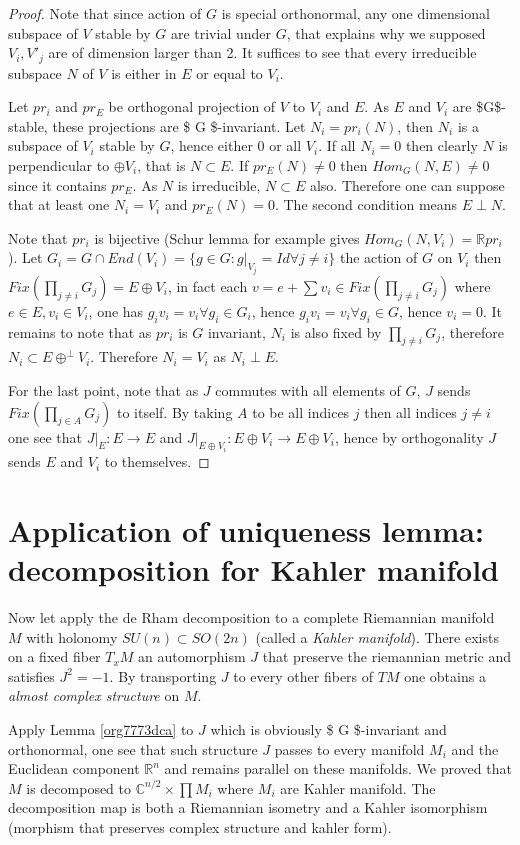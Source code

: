 \documentclass[11pt]{article}
\begin{document}
\begin{proof}
Note that since action of \(G\) is special orthonormal, any one dimensional subspace of \(V\) stable by
\(G\) are trivial under \(G\), that explains why we supposed \(V_i, V'_j\) are of dimension larger
than 2. It suffices to see that every irreducible subspace \(N\) of \(V\) is either in \(E\) or equal to
\(V_i\).

Let \(pr_i\) and \(pr_E\) be orthogonal projection of \(V\) to \(V_i\) and \(E\). As \(E\) and \(V_i\) are \$G\$-stable, these
projections are \$ G \$-invariant. Let \(N_i = pr_i(N)\), then \(N_i\) is a subspace of \(V_i\) stable
by \(G\), hence either \(0\) or all \(V_i\). If all \(N_i=0\) then clearly \(N\) is perpendicular to \(\oplus
V_i\), that is \(N\subset E\). If \(pr_E(N)\ne 0\) then \(Hom_G(N, E) \ne 0\) since it contains \(pr_E\). As
\(N\) is irreducible, \(N\subset E\) also. Therefore one can suppose that at least one \(N_i = V_i\) and
\(pr_E(N) = 0\). The second condition means \(E\perp N\). 

Note that \(pr_i\) is bijective (Schur lemma for example gives \(Hom_G(N,V_i) = \mathbb{R}pr_i\)). 
Let \(G_i = G\cap End(V_i) = \{g\in G: g|_{V_j} = Id \forall j\ne i \}\) the action of \(G\) on \(V_i\)
then \(Fix(\prod_{j\ne i} G_j)= E\oplus V_i\), in fact each \(v = e +\sum v_i\in Fix(\prod_{j\ne i}
G_j)\) where \(e\in E, v_i\in V_i\), one has \(g_i v_i = v_i \forall g_i \in G_i\), hence \(g_i v_i = v_i
\forall g_i\in G\), hence \(v_i = 0\). It remains to note that as \(pr_i\) is \(G\) invariant, \(N_i\) is
also fixed by \(\prod_{j\ne i}G_j\), therefore \(N_i\subset E \oplus^\perp V_i\). Therefore \(N_i=V_i\) as
\(N_i\perp E\).

For the last point, note that as \(J\) commutes with all elements of \(G\), \(J\) sends \(Fix(\prod_{j\in A}
G_j)\) to itself. By taking \(A\) to be all indices \(j\) then all indices \(j\ne i\) one see that \(J|_E:
E\longrightarrow E\) and \(J|_{E\oplus V_i}: E\oplus V_i\longrightarrow E\oplus V_i\), hence by
orthogonality \(J\) sends \(E\) and \(V_i\) to themselves.
\end{proof}


\section{Application of uniqueness lemma: decomposition for Kahler manifold}
\label{sec:orgd517714}
Now let apply the de Rham decomposition to a complete Riemannian manifold \(M\) with holonomy \(SU(n)
\subset SO(2n)\) (called a \emph{Kahler manifold}). There exists on a fixed fiber \(T_xM\) an automorphism
\(J\) that preserve the riemannian metric and satisfies \(J^2 = -1\). By transporting \(J\) to every other
fibers of \(TM\) one obtains a \emph{almost complex structure} on \(M\).

Apply Lemma \ref{org7773dca} to \(J\) which is obviously \$ G \$-invariant and orthonormal, one
see that such structure \(J\) passes to every manifold \(M_i\) and the Euclidean component \(\mathbb{R}^n\) and
remains parallel on these manifolds. We proved that \(M\) is decomposed to \(\mathbb{C}^{n/2}\times
\prod M_i\) where \(M_i\) are Kahler manifold. The decomposition map is both a Riemannian isometry and a
Kahler isomorphism (morphism that preserves complex structure and kahler form). 
\end{document}
